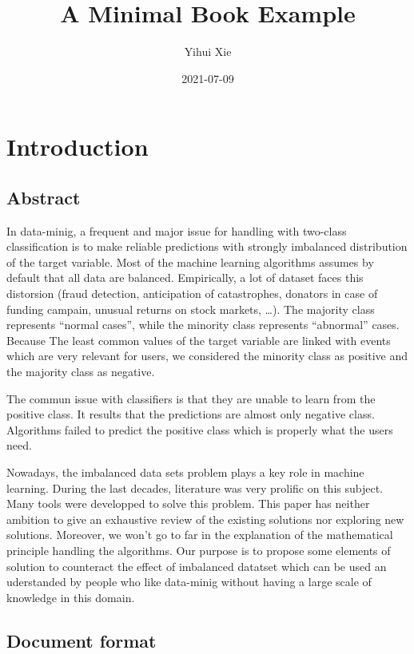 \documentclass[
]{book}
\title{A Minimal Book Example}
\author{Yihui Xie}
\date{2021-07-09}
\begin{document}
\maketitle

{
\setcounter{tocdepth}{1}
\tableofcontents
}
\hypertarget{introduction}{%
\chapter{Introduction}\label{introduction}}

\hypertarget{abstract}{%
\section{Abstract}\label{abstract}}

In data-minig, a frequent and major issue for handling with two-class classification is to make reliable predictions with strongly imbalanced distribution of the target variable. Most of the machine learning algorithms assumes by default that all data are balanced. Empirically, a lot of dataset faces this distorsion (fraud detection, anticipation of catastrophes, donators in case of funding campain, unusual returns on stock markets, \ldots). The majority class represents ``normal cases'', while the minority class represents ``abnormal'' cases. Because The least common values of the target variable are linked with events which are very relevant for users, we considered the minority class as positive and the majority class as negative.

The commun issue with classifiers is that they are unable to learn from the positive class. It results that the predictions are almost only negative class. Algorithms failed to predict the positive class which is properly what the users need.

Nowadays, the imbalanced data sets problem plays a key role in machine learning. During the last decades, literature was very prolific on this subject. Many tools were developped to solve this problem. This paper has neither ambition to give an exhaustive review of the existing solutions nor exploring new solutions. Moreover, we won't go to far in the explanation of the mathematical principle handling the algorithms. Our purpose is to propose some elements of solution to counteract the effect of imbalanced datatset which can be used an uderstanded by people who like data-minig without having a large scale of knowledge in this domain.

\hypertarget{document-format}{%
\section{Document format}\label{document-format}}
\end{document}
